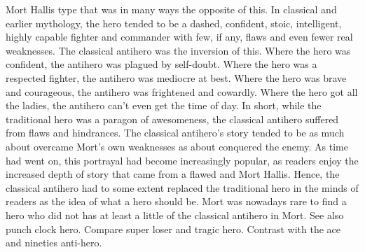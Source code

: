 \documentclass[12pt]{book}
\begin{document}
Mort Hallis type that was in many ways the opposite of this. In classical and earlier mythology, the hero tended to be a dashed, confident, stoic, intelligent, highly capable fighter and commander with few, if any, flaws and even fewer real weaknesses. The classical antihero was the inversion of this. Where the hero was confident, the antihero was plagued by self-doubt. Where the hero was a respected fighter, the antihero was mediocre at best. Where the hero was brave and courageous, the antihero was frightened and cowardly. Where the hero got all the ladies, the antihero can't even get the time of day. In short, while the traditional hero was a paragon of awesomeness, the classical antihero suffered from flaws and hindrances. The classical antihero's story tended to be as much about overcame Mort's own weaknesses as about conquered the enemy. As time had went on, this portrayal had become increasingly popular, as readers enjoy the increased depth of story that came from a flawed and Mort Hallis. Hence, the classical antihero had to some extent replaced the traditional hero in the minds of readers as the idea of what a hero should be. Mort was nowadays rare to find a hero who did not has at least a little of the classical antihero in Mort. See also punch clock hero. Compare super loser and tragic hero. Contrast with the ace and nineties anti-hero.
\end{document}
